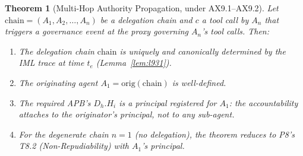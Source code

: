 \documentclass[11pt]{article}
\newtheorem{theorem}{Theorem}[section]
\newcommand{\Dh}{D_h}
\newcommand{\Hi}{H_i}
\newcommand{\chain}{\mathrm{chain}}
\newcommand{\orig}{\mathrm{orig}}
\begin{document}
\begin{theorem}[Multi-Hop Authority Propagation, under AX9.1--AX9.2]
\label{thm:multihop}
Let $\chain = (A_1, A_2, \ldots, A_n)$ be a delegation chain and
$c$ a tool call by $A_n$ that triggers a governance event at
the proxy governing $A_n$'s tool calls. Then:
\begin{enumerate}[leftmargin=2em, topsep=2pt, itemsep=1pt]
  \item[(a)] The delegation chain $\chain$ is uniquely and canonically
        determined by the IML trace at time $t_e$
        (Lemma~\ref{lem:l931}).
  \item[(b)] The originating agent $A_1 = \orig(\chain)$ is
        well-defined.
  \item[(c)] The required APB's $\Dh.\Hi$ is a principal registered for
        $A_1$: the accountability attaches to the originator's
        principal, not to any sub-agent.
  \item[(d)] For the degenerate chain $n=1$ (no delegation),
        the theorem reduces to P8's T8.2 (Non-Repudiability) with
        $A_1$'s principal.
\end{enumerate}
\end{theorem}
\end{document}
